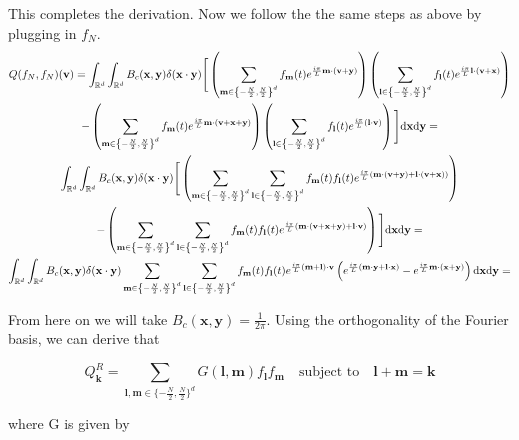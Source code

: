 \documentclass{article}
\def\b{\mathbf}
\def\t{\text}
\begin{document}
This completes the derivation. Now we follow the the same steps as above by plugging in $f_N$. 
\begin{gather*}
    Q(f_N,f_N)(\b v) = \int_{\mathbb{R}^d} \int_{\mathbb{R}^d} B_c(\b x, \b y) \delta( \b x \cdot \b y)\Bigg[ \left( \sum_{\b m \in \left\{-\frac{N}{2}, \frac{N}{2}\right\}^d} f_{\b m}(t) e^{\frac{i \pi}{L} \b m \cdot (\b v + \b y) } \right) \left( \sum_{\b l \in \left\{-\frac{N}{2}, \frac{N}{2}\right\}^d} f_{\b l}(t) e^{\frac{i \pi}{L} \b l \cdot (\b v + \b x) } \right)\\
    - \left( \sum_{\b m \in \left\{-\frac{N}{2}, \frac{N}{2}\right\}^d} f_{\b m}(t) e^{\frac{i \pi}{L} \b m \cdot (\b v + \b x + \b y) } \right) \left( \sum_{\b l \in \left\{-\frac{N}{2}, \frac{N}{2}\right\}^d} f_{\b l}(t) e^{\frac{i \pi}{L}(\b l \cdot \b v ) } \right) \Bigg] \t d \b x \t d \b y = \\
    \int_{\mathbb{R}^d} \int_{\mathbb{R}^d} B_c(\b x, \b y) \delta( \b x \cdot \b y)\Bigg[ \left( \sum_{\b m \in \left\{-\frac{N}{2}, \frac{N}{2}\right\}^d} \sum_{\b l \in \left\{-\frac{N}{2}, \frac{N}{2}\right\}^d} f_{\b m}(t) f_{\b l}(t) e^{\frac{i \pi}{L} (\b m \cdot (\b v + \b y) + \b l \cdot (\b v + \b x)) } \right)\\
    - \left( \sum_{\b m \in \left\{-\frac{N}{2}, \frac{N}{2}\right\}^d} \sum_{\b l \in \left\{-\frac{N}{2}, \frac{N}{2}\right\}^d} f_{\b m}(t) f_{\b l}(t) e^{\frac{i \pi}{L} (\b m \cdot (\b v + \b x + \b y) + \b l \cdot \b v) } \right) \Bigg] \t d \b x \t d \b y = \\
    \int_{\mathbb{R}^d} \int_{\mathbb{R}^d} B_c(\b x, \b y) \delta( \b x \cdot \b y) \sum_{\b m \in \left\{-\frac{N}{2}, \frac{N}{2}\right\}^d} \sum_{\b l \in \left\{-\frac{N}{2}, \frac{N}{2}\right\}^d} f_{\b m}(t) f_{\b l}(t) e^{\frac{i \pi}{L} (\b m + \b l) \cdot \b v} \left( e^{\frac{i \pi}{L} (\b m \cdot \b y + \b l \cdot \b x) } - e^{\frac{i \pi}{L} \b m \cdot (\b x + \b y) }\right) \t d \b x \t d \b y = 
\end{gather*}

From here on we will take $B_c(\b x, \b y) = \frac{1}{2 \pi}$. Using the orthogonality of the Fourier basis, we can derive that

\begin{equation} \label{eq:QR_carl}
    Q^R_{\b k} = \sum_{\b l,\b m \in \{-\frac{N}{2}, \frac{N}{2}\}^d} G(\b l,\b m) f_{\b l} f_{\b m} \quad \text{subject to} \quad \b l + \b m = \b k
\end{equation}

where G is given by
\end{document}
